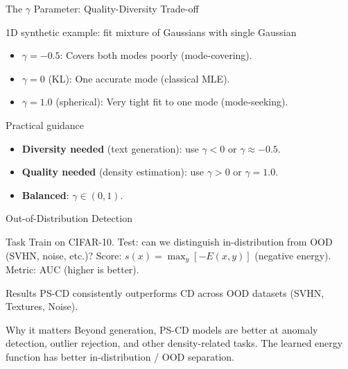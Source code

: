 \documentclass{beamer}
\begin{document}
\begin{frame}{The $\gamma$ Parameter: Quality-Diversity Trade-off}
\small
\begin{block}{1D synthetic example: fit mixture of Gaussians with single Gaussian}
\begin{itemize}
    \item $\gamma = -0.5$: Covers both modes poorly (mode-covering).
    \item $\gamma = 0$ (KL): One accurate mode (classical MLE).
    \item $\gamma = 1.0$ (spherical): Very tight fit to one mode (mode-seeking).
\end{itemize}
\end{block}

\begin{block}{Practical guidance}
\begin{itemize}
    \item \textbf{Diversity needed} (text generation): use $\gamma < 0$ or $\gamma \approx -0.5$.
    \item \textbf{Quality needed} (density estimation): use $\gamma > 0$ or $\gamma = 1.0$.
    \item \textbf{Balanced}: $\gamma \in (0, 1)$.
\end{itemize}
\end{block}
\end{frame}


\begin{frame}{Out-of-Distribution Detection}
\small
\begin{block}{Task}
Train on CIFAR-10. Test: can we distinguish in-distribution from OOD (SVHN, noise, etc.)?
Score: $s(x) = \max_y [-E(x,y)]$ (negative energy). Metric: AUC (higher is better).
\end{block}

\begin{block}{Results}
PS-CD consistently outperforms CD across OOD datasets (SVHN, Textures, Noise).
\end{block}

\begin{block}{Why it matters}
Beyond generation, PS-CD models are better at anomaly detection, outlier rejection, and other density-related tasks. The learned energy function has better in-distribution / OOD separation.
\end{block}
\end{frame}
\end{document}
